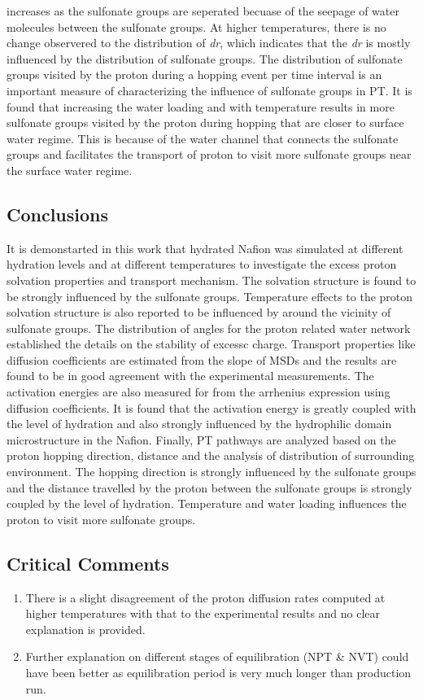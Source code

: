 \documentclass{article}
\begin{document}
increases as the sulfonate groups are seperated becuase of the seepage of water molecules between the sulfonate groups. At higher temperatures, there is no change observered to the distribution of \emph{dr}, which indicates that the \emph{dr} is mostly influenced by the distribution of sulfonate groups. The distribution of sulfonate groups visited by the proton during a hopping event per time interval is an important measure of characterizing the influence of sulfonate groups in PT. It is found that increasing the water loading and with temperature results in more sulfonate groups visited by the proton during hopping that are closer to surface water regime. This is because of the water channel that connects the sulfonate groups and facilitates the transport of proton to visit more sulfonate groups near the surface water regime.

\subsection{Conclusions}
\label{sec-3-4}
It is demonstarted in this work that hydrated Nafion was simulated at different hydration levels and at different temperatures to investigate the excess proton solvation properties and transport mechanism. The solvation structure is found to be strongly influenced by the sulfonate groups. Temperature effects to the proton solvation structure is also reported to be influenced by around the vicinity of sulfonate groups. The distribution of angles for the proton related water network established the details on the stability of excessc charge. Transport properties like diffusion coefficients are estimated from the slope of MSDs and the results are found to be in good agreement with the experimental measurements. The activation energies are also measured for from the arrhenius expression using diffusion coefficients. It is found that the activation energy is greatly coupled with the level of hydration and also strongly influenced by the hydrophilic domain microstructure in the Nafion. Finally, PT pathways are analyzed based on the proton hopping direction, distance and the analysis of distribution of surrounding environment. The hopping direction is strongly influenced by the sulfonate groups and the distance travelled by the proton between the sulfonate groups is strongly coupled by the level of hydration. Temperature and water loading influences the proton to visit more sulfonate groups.

\subsection{Critical Comments}
\label{sec-3-5}
\begin{enumerate}
\item There is a slight disagreement of the proton diffusion rates computed at higher temperatures with that to the experimental results and no clear explanation is provided.
\item Further explanation on different stages of equilibration (NPT \& NVT) could have been better as equilibration period is very much longer than production run.
\end{enumerate}






\end{document}
